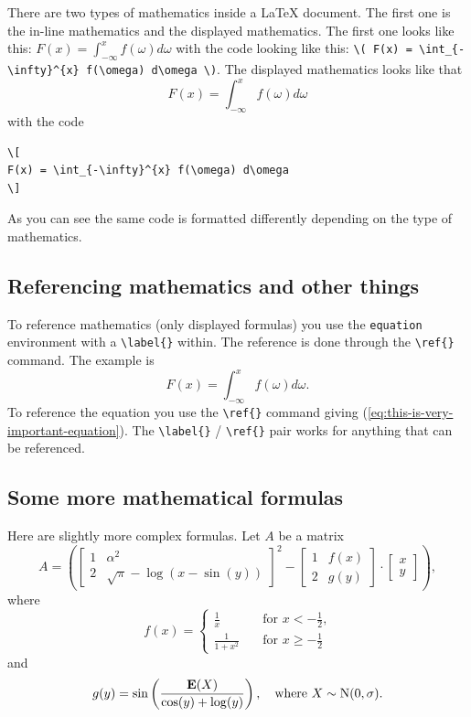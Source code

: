 \documentclass[english, twoside, 12pt, a4paper]{article}
\theoremstyle{definition}
\theoremstyle{plain}
\theoremstyle{remark}
\begin{document}
There are two types of mathematics inside a \LaTeX{} document. The first one is the in-line mathematics and the displayed mathematics. The first one looks like this: \( F(x) = \int_{-\infty}^{x} f(\omega) d\omega \) with the code looking like this: \verb!\( F(x) = \int_{-\infty}^{x} f(\omega) d\omega \)!. The displayed mathematics looks like that
\[
F(x) = \int_{-\infty}^{x} f(\omega) d\omega
\]
with the code
\begin{verbatim}
\[
F(x) = \int_{-\infty}^{x} f(\omega) d\omega
\]
\end{verbatim}
As you can see the same code is formatted differently depending on the type of mathematics.

\subsection{Referencing mathematics and other things}

To reference mathematics (only displayed formulas) you use the \verb+equation+ environment with a \verb+\label{}+ within. The reference is done through the \verb+\ref{}+ command. The example is
\begin{equation}
\label{eq:this-is-very-important-equation}
F(x) = \int_{-\infty}^{x} f(\omega) d\omega.
\end{equation}
To reference the equation you use the \verb+\ref{}+ command giving (\ref{eq:this-is-very-important-equation}). The \verb+\label{}+ / \verb+\ref{}+ pair works for anything that can be referenced.

\subsection{Some more mathematical formulas}

Here are slightly more complex formulas. Let \( A  \) be a matrix
\[
A =
\left(
\begin{bmatrix}
1                   & \alpha^2       \\
2                   & \sqrt{\pi} - \log(x-\sin(y))
\end{bmatrix}^{2}
- 
\begin{bmatrix}
1                   & f(x)           \\
2                   & g(y)
\end{bmatrix}
\cdot
\begin{bmatrix}
x                                    \\
y
\end{bmatrix}
\right),
\]
where
\[
f(x) = 
\left\{
  \begin{aligned}
    \frac{1}{x}     & \quad \text{for \(x<-\frac{1}{2}\),} \\
    \frac{1}{1+x^2} & \quad \text{for \(x \geq -\frac{1}{2}\)}
  \end{aligned}
\right.
\]
and
\[
g(y) = \sin\left(\frac{\mathrm{\mathbf{E}}(X)}{\cos(y) + \log(y)}\right), 
\quad\text{where \( X \sim \mathrm{N}(0, \sigma)  \).}
\]
\end{document}
